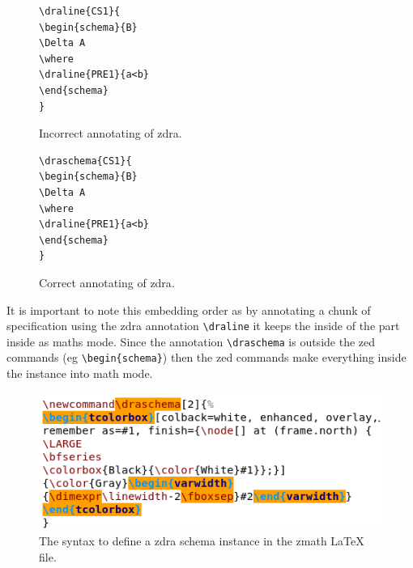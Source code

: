 \begin{figure}[H]
\vspace{-0.2in}
\centering
\begin{minipage}{0.45\textwidth}
\centering
\begin{small}
\begin{BVerbatim}
\draline{CS1}{
\begin{schema}{B}
\Delta A
\where
\draline{PRE1}{a<b}
\end{schema}
}
\end{BVerbatim}
\end{small}
\vspace{-0.18in}
\caption{Incorrect annotating of \gls{zdra}.\label{fig:zdraincorrectannotations}}
\vspace{-0.2in}
\end{minipage}\hfill
\begin{minipage}{0.45\textwidth}
\centering
\begin{small}
\begin{BVerbatim}
\draschema{CS1}{
\begin{schema}{B}
\Delta A
\where
\draline{PRE1}{a<b}
\end{schema}
}
\end{BVerbatim}
\end{small}
\vspace{-0.2in}
\caption{Correct annotating of \gls{zdra}.\label{fig:zdracorrectannotations}}
\vspace{-0.2in}
\end{minipage}
\end{figure}

It is important to note this embedding order as by annotating a chunk of specification using the \gls{zdra} annotation \verb|\draline| it keeps the inside of the part inside as maths mode. Since the annotation \verb|\draschema| is outside the zed commands (eg \verb|\begin{schema}|) then the zed commands make everything inside the instance into math mode.

\begin{figure}[H]
\includegraphics[scale=0.7]{Figures/Design/zmathb.png}
\caption{The syntax to define a \gls{zdra} schema instance in the \gls{zmath} \LaTeX{} file. \label{fig:latexzdraschema}}
\end{figure}

